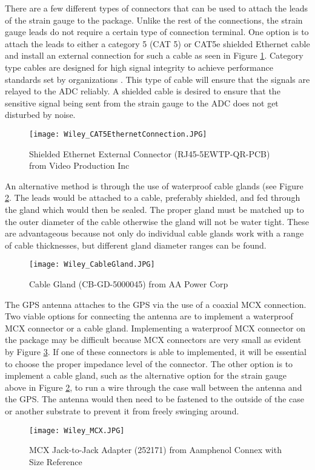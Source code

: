 There are a few different types of connectors that can be used to attach the leads of the strain gauge to the package. Unlike the rest of the
connections, the strain gauge leads do not require a certain type of connection terminal. One option is to attach the leads to either a category 5 (CAT
5) or CAT5e shielded Ethernet cable and install an external connection for such a cable as seen in Figure \ref{fig:CAT5}. Category type cables are
designed for high signal integrity to achieve performance standards set by organizations \cite{gareis2003surfaced}. This type of cable will ensure that the signals are relayed to the ADC reliably. A shielded cable is desired to
ensure that the sensitive signal being sent from the strain gauge to the ADC does not get disturbed by noise. 
\begin{figure}[h]
\centering
\texttt{[image: Wiley\_CAT5EthernetConnection.JPG]}
\caption{\label{fig:CAT5} Shielded Ethernet External Connector (RJ45-5EWTP-QR-PCB) from Video Production Inc}
\end{figure}

An alternative method is through the use of waterproof cable glands (see Figure \ref{fig:Cable Gland}. The leads would be attached to a cable, preferably
shielded, and fed through the gland which would then be sealed. The proper gland must be matched up to the outer diameter of the cable otherwise the
gland will not be water tight. These are advantageous because not only do individual cable glands work with a range of cable thicknesses, but different
gland diameter ranges can be found. 
\begin{figure}[ht]
\centering
\texttt{[image: Wiley\_CableGland.JPG]}
\caption{\label{fig:Cable Gland} Cable Gland (CB-GD-5000045) from AA Power Corp}
\end{figure}


The GPS antenna attaches to the GPS via the use of a coaxial MCX connection. Two viable options for connecting the antenna are to implement a waterproof
MCX connector or a cable gland. Implementing a waterproof MCX connector on the package may be difficult because MCX connectors are very small as evident
by Figure \ref{fig:MCX}. If one of these connectors is able to implemented, it will be essential to choose the proper impedance level of the
connector. The other option is to implement a cable gland, such as the alternative option for the strain gauge above in Figure \ref{fig:Cable Gland},
to run a wire through the case wall between the antenna and the GPS. The antenna would then need to be fastened to the outside of the case or another
substrate to prevent it from freely swinging around. 
\begin{figure}[ht]
\centering
\texttt{[image: Wiley\_MCX.JPG]}
\caption{\label{fig:MCX} MCX Jack-to-Jack Adapter (252171) from Aamphenol Connex with Size Reference}
\end{figure}


